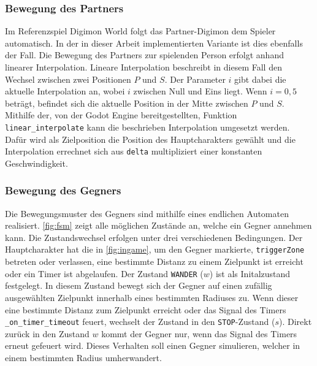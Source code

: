 \subsubsection{Bewegung des Partners}
Im Referenzspiel Digimon World folgt das Partner-Digimon dem Spieler automatisch.
In der in dieser Arbeit implementierten Variante ist dies ebenfalls der Fall.
Die Bewegung des Partners zur spielenden Person erfolgt anhand linearer Interpolation.
Lineare Interpolation beschreibt in diesem Fall den Wechsel zwischen zwei Positionen $P$ und $S$.
Der Parameter $i$  gibt dabei die aktuelle Interpolation an, wobei $i$ zwischen Null und Eins liegt.
Wenn $i=0{,}5$ beträgt, befindet sich die aktuelle Position in der Mitte zwischen $P$ und $S$.
Mithilfe der, von der Godot Engine bereitgestellten, Funktion \texttt{linear\_interpolate} kann die beschrieben Interpolation umgesetzt werden.
Dafür wird als Zielposition die Position des Hauptcharakters gewählt und die Interpolation errechnet sich aus \texttt{delta} multipliziert einer konstanten Geschwindigkeit. \\

\subsubsection{Bewegung des Gegners}
Die Bewegungsmuster des Gegners sind mithilfe eines endlichen Automaten realisiert.
\autoref{fig:fsm} zeigt alle möglichen Zustände an, welche ein Gegner annehmen kann.
Die Zustandswechsel erfolgen unter drei verschiedenen Bedingungen.
Der Hauptcharakter hat die in \autoref{fig:ingame}, um den Gegner markierte, \texttt{triggerZone} betreten oder verlassen, eine bestimmte Distanz zu einem Zielpunkt ist erreicht oder ein Timer ist abgelaufen.
Der Zustand \texttt{WANDER} ($w$) ist als Initalzustand festgelegt.
In diesem Zustand bewegt sich der Gegner auf einen zufällig ausgewählten Zielpunkt innerhalb eines bestimmten Radiuses zu.
Wenn dieser eine bestimmte Distanz zum Zielpunkt erreicht oder das Signal des Timers \texttt{\_on\_timer\_timeout} feuert, wechselt der Zustand in den \texttt{STOP}-Zustand ($s$).
Direkt zurück in den Zustand $w$ kommt der Gegner nur, wenn das Signal des Timers erneut gefeuert wird.
Dieses Verhalten soll einen Gegner simulieren, welcher in einem bestimmten Radius umherwandert. \\



